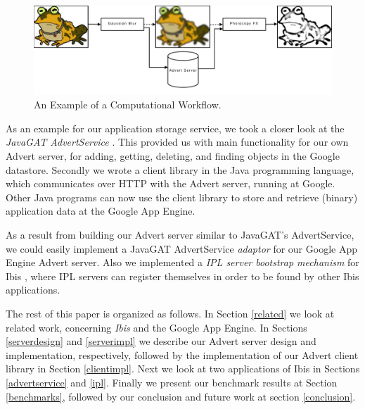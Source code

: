 \begin{figure}[ht] %
\begin{center}
\includegraphics[width=14cm]{./figures/image_workflow.pdf} 
\caption{An Example of a Computational Workflow.\label{img-workflow}}
\end{center}
\end{figure}

As an example for our application storage service, we took a closer look at
the \emph{JavaGAT AdvertService} \cite{javagat-www}. This provided us with main
functionality for our own Advert server, for adding, getting, deleting, and
finding objects in the Google datastore. Secondly we wrote a client library in
the Java programming language, which communicates over HTTP with the Advert
server, running at Google. Other Java programs can now use the client library
to store and retrieve (binary) application data at the Google App Engine.

As a result from building our Advert server similar to JavaGAT's AdvertService,
we could easily implement a JavaGAT AdvertService \emph{adaptor} for our
Google App Engine Advert server. Also we implemented a \emph{IPL server
bootstrap mechanism} for Ibis \cite{ipl-www}, where IPL servers can register
themselves in order to be found by other Ibis applications.

The rest of this paper is organized as follows. In Section \ref{related}
we look at related work, concerning \emph{Ibis} and the Google App Engine. In
Sections \ref{serverdesign} and \ref{serverimpl} we describe our Advert server
design and implementation, respectively, followed by the implementation of our
Advert client library in Section \ref{clientimpl}. Next we look at two
applications of Ibis in Sections \ref{advertservice} and \ref{ipl}. Finally we
present our benchmark results at Section \ref{benchmarks}, followed by our
conclusion and future work at section \ref{conclusion}.

